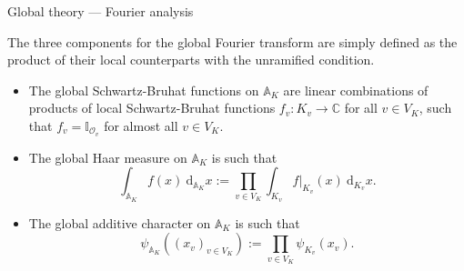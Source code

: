 \documentclass[10pt]{beamer}
\begin{document}
\begin{frame}[t]{Global theory --- Fourier analysis}

The three components for the global Fourier transform are simply defined as the product of their local counterparts with the unramified condition.
\begin{itemize}
\item<2-> The global Schwartz-Bruhat functions on $ \mathbb{A}_K $ are linear combinations of products of local Schwartz-Bruhat functions $ f_v : K_v \to \mathbb{C} $ for all $ v \in V_K $, such that $ f_v = \mathbb{I}_{\mathcal{O}_v} $ for almost all $ v \in V_K $.
\item<3-> The global Haar measure on $ \mathbb{A}_K $ is such that
$$ \int_{\mathbb{A}_K} f(x) \ \mathrm{d}_{\mathbb{A}_K}x := \prod_{v \in V_K} \int_{K_v} f|_{K_v}(x) \ \mathrm{d}_{K_v}x. $$
\item<4-> The global additive character on $ \mathbb{A}_K $ is such that
$$ \psi_{\mathbb{A}_K}((x_v)_{v \in V_K}) := \prod_{v \in V_K} \psi_{K_v}(x_v). $$
\end{itemize}

\end{frame}
\end{document}
